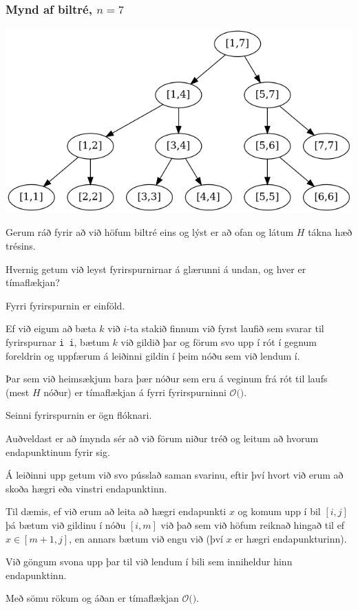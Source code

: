 {
	\frametitle{Mynd af biltré, $n = 7$}
	{
		\includegraphics[scale=0.3]{fig/mynd3.png}
	}
}

{
	{
		\item<1-> Gerum ráð fyrir að við höfum biltré eins og lýst er að ofan og látum $H$ tákna hæð trésins.
		\item<2-> Hvernig getum við leyst fyrirspurnirnar á glærunni á undan, og hver er tímaflækjan?
		\item<3-> Fyrri fyrirspurnin er einföld.
		\item<4-> Ef við eigum að bæta $k$ við $i$-ta stakið finnum við fyrst laufið sem svarar til fyrirspurnar \texttt{i i},
					bætum $k$ við gildið þar og förum svo upp í rót í gegnum foreldrin og uppfærum á leiðinni gildin í þeim nóðu sem við lendum í.
		\item<5-> Þar sem við heimsækjum bara þær nóður sem eru á veginum frá rót til laufs (mest $H$ nóður)
					er tímaflækjan á fyrri fyrirspurninni $\mathcal{O}($\onslide<6->{$\,H\,$}$)$.
	}
}

{
}

{
	{
		\item<1-> Seinni fyrirspurnin er ögn flóknari.
		\item<2-> Auðveldast er að ímynda sér að við förum niður tréð og leitum að hvorum endapunktinum fyrir sig.
		\item<3-> Á leiðinni upp getum við svo pússlað saman svarinu, eftir því hvort við erum að skoða hægri eða vinstri endapunktinn.
		\item<4-> Til dæmis, ef við erum að leita að hægri endapunkti $x$ og komum upp í bil $[i, j]$ þá bætum við gildinu í nóðu
			$[i, m]$ við það sem við höfum reiknað hingað til ef $x \in [m + 1, j]$, en annars bætum við engu við (því $x$ er hægri endapunkturinn).
		\item<5-> Við göngum svona upp þar til við lendum í bili sem inniheldur hinn endapunktinn.
		\item<6-> Með sömu rökum og áðan er tímaflækjan $\mathcal{O}($\onslide<7->{$\,H\,$}$)$.
	}
}

